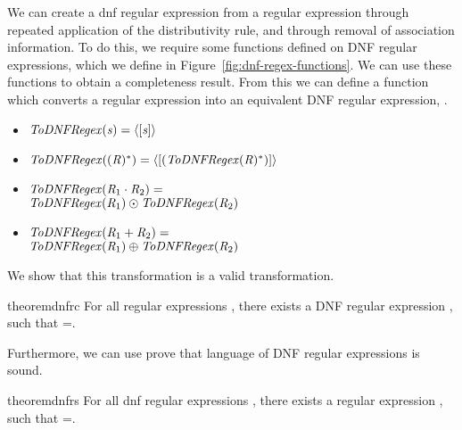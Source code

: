 We can create a dnf regular expression from a regular expression through repeated
application of the distributivity rule, and through removal of association information.  To do this, we require some functions defined on DNF regular expressions,
which we define in Figure~\ref{fig:dnf-regex-functions}.
We can use these functions to obtain a completeness result.
From this we can define a function which converts a regular expression into
an equivalent DNF regular expression, \ToDNFRegex{}.  
\begin{definition}
\leavevmode
\begin{itemize}
\item $\mathit{ToDNFRegex}(\mathit{s})=\langle[\mathit{s}]\rangle$
\item $\mathit{ToDNFRegex}((\mathit{R})^*) = \langle[(\mathit{ToDNFRegex}(\mathit{R})^*)]\rangle$
\item $\mathit{ToDNFRegex}(\mathit{R}_1\cdot\mathit{R}_2) =$\\
\hspace*{1em}$\mathit{ToDNFRegex}(\mathit{R}_1)\odot\mathit{ToDNFRegex}(\mathit{R}_2)$
\item $\mathit{ToDNFRegex}(\mathit{R}_1+\mathit{R}_2) =$\\
\hspace*{1em}$\mathit{ToDNFRegex}(\mathit{R}_1)\oplus\mathit{ToDNFRegex}(\mathit{R}_2)$
\end{itemize}
\end{definition}
We show that this transformation is a valid transformation.
\begin{restatable}{theorem}{dnfrc}
\label{thm:completeness-dnf-lenses}
For all regular expressions \Regex{},
there exists a DNF regular expression \DNFRegex{},
such that \LanguageOf{\DNFRegex{}}=\LanguageOf{\Regex{}}.
\end{restatable}

Furthermore, we can use prove that language of DNF regular expressions is sound.

\begin{restatable}{theorem}{dnfrs}
\label{thm:soundness-dnf-lenses}
For all dnf regular expressions \DNFRegex{},
there exists a regular expression \Regex{},
such that \LanguageOf{\Regex{}}=\LanguageOf{\DNFRegex{}}.
\end{restatable}


